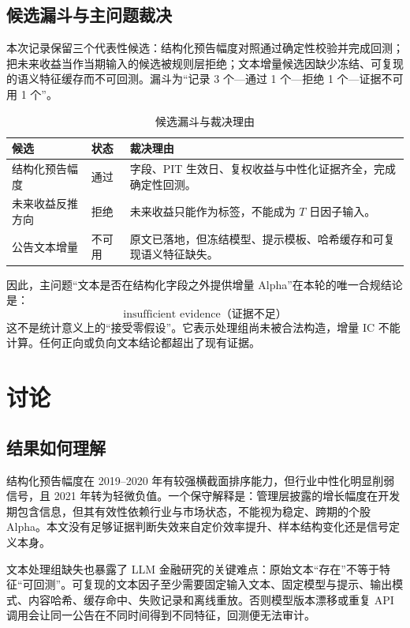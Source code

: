 \documentclass[UTF8,zihao=-4]{ctexart}
\theoremstyle{accentthm}
\begin{document}
\subsection{候选漏斗与主问题裁决}

本次记录保留三个代表性候选：结构化预告幅度对照通过确定性校验并完成回测；把未来收益当作当期输入的候选被规则层拒绝；文本增量候选因缺少冻结、可复现的语义特征缓存而不可回测。漏斗为“记录 3 个—通过 1 个—拒绝 1 个—证据不可用 1 个”。

\begin{table}[H]
  \centering
  \caption{候选漏斗与裁决理由}
  \label{tab:funnel}
  \begin{tabular}{p{3.3cm}p{2.2cm}p{7.7cm}}
    \toprule
    候选 & 状态 & 裁决理由 \\
    \midrule
    结构化预告幅度 & 通过 & 字段、PIT 生效日、复权收益与中性化证据齐全，完成确定性回测。 \\
    未来收益反推方向 & 拒绝 & 未来收益只能作为标签，不能成为 $T$ 日因子输入。 \\
    公告文本增量 & 不可用 & 原文已落地，但冻结模型、提示模板、哈希缓存和可复现语义特征缺失。 \\
    \bottomrule
  \end{tabular}
\end{table}

因此，主问题“文本是否在结构化字段之外提供增量 Alpha”在本轮的唯一合规结论是：
\[
  \boxed{\text{insufficient evidence（证据不足）}}
\]
这不是统计意义上的“接受零假设”。它表示处理组尚未被合法构造，增量 IC 不能计算。任何正向或负向文本结论都超出了现有证据。

\section{讨论}\label{sec:discussion}

\subsection{结果如何理解}

结构化预告幅度在 2019--2020 年有较强横截面排序能力，但行业中性化明显削弱信号，且 2021 年转为轻微负值。一个保守解释是：管理层披露的增长幅度在开发期包含信息，但其有效性依赖行业与市场状态，不能视为稳定、跨期的个股 Alpha。本文没有足够证据判断失效来自定价效率提升、样本结构变化还是信号定义本身。

文本处理组缺失也暴露了 LLM 金融研究的关键难点：原始文本“存在”不等于特征“可回测”。可复现的文本因子至少需要固定输入文本、固定模型与提示、输出模式、内容哈希、缓存命中、失败记录和离线重放。否则模型版本漂移或重复 API 调用会让同一公告在不同时间得到不同特征，回测便无法审计。
\end{document}
